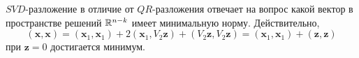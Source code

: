 \begin{remark}
  $SVD$-разложение в отличие от $QR$-разложения отвечает на вопрос
  какой вектор в пространстве решений $\mathbb{R}^{n-k}$ имеет минимальную
  норму. Действительно,
  \[(\mathbf{x},\mathbf{x})=(\mathbf{x}_1,\mathbf{x}_1)+2(\mathbf{x}_1,V_2\mathbf{z})+(V_2\mathbf{z},V_2\mathbf{z})=(\mathbf{x}_1,\mathbf{x}_1)+(\mathbf{z},\mathbf{z})\]
  при $\mathbf{z}=0$ достигается минимум.
\end{remark}
